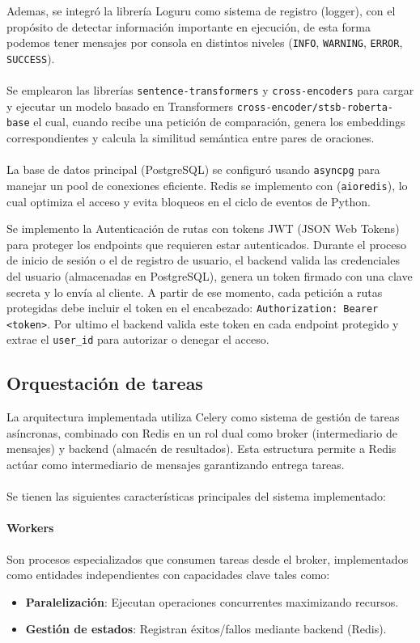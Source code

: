 Ademas, se integró la librería Loguru como sistema de registro (logger), con el propósito de detectar información importante en ejecución, de esta forma podemos tener mensajes por consola en distintos niveles (\texttt{INFO}, \texttt{WARNING}, \texttt{ERROR}, \texttt{SUCCESS}).
\\
\\
Se emplearon las librerías \texttt{sentence-transformers} y \texttt{cross-encoders} para cargar y ejecutar un modelo basado en Transformers \texttt{cross-encoder/stsb-roberta-base} el cual, cuando recibe una petición de comparación, genera los embeddings correspondientes y calcula la similitud semántica entre pares de oraciones.
\\
\\
La base de datos principal (PostgreSQL) se configuró usando \texttt{asyncpg} para manejar un pool de conexiones eficiente. Redis se implemento con (\texttt{aioredis}), lo cual optimiza el acceso y evita bloqueos en el ciclo de eventos de Python.

\newpage
Se implemento la Autenticación de rutas con tokens JWT (JSON Web Tokens) para proteger los endpoints que requieren estar autenticados. Durante el proceso de inicio de sesión o el de registro de usuario, el backend valida las credenciales del usuario (almacenadas en PostgreSQL), genera un token firmado con una clave secreta y lo envía al cliente. A partir de ese momento, cada petición a rutas protegidas debe incluir el token en el encabezado: \texttt{Authorization: Bearer <token>}. Por ultimo el backend valida este token en cada endpoint protegido y extrae el \texttt{user\_id} para autorizar o denegar el acceso.

\subsection{Orquestación de tareas}

La arquitectura implementada utiliza Celery como sistema de gestión de tareas asíncronas, combinado con Redis en un rol dual como broker (intermediario de mensajes) y backend (almacén de resultados). Esta estructura permite a Redis actúar como intermediario de mensajes garantizando entrega tareas.
\\
\\
Se tienen las siguientes características principales del sistema implementado:

\paragraph{Workers} 
Son procesos especializados que consumen tareas desde el broker, implementados como entidades independientes con capacidades clave tales como:
\begin{itemize}
    \item \textbf{Paralelización}: Ejecutan operaciones concurrentes maximizando recursos.
    \item \textbf{Gestión de estados}: Registran éxitos/fallos mediante backend (Redis).
\end{itemize}

